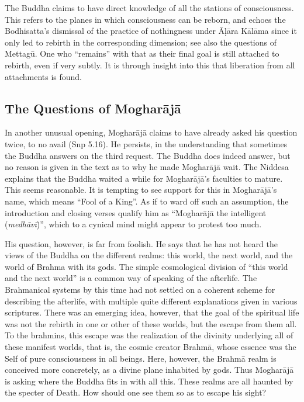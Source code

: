 \documentclass[12pt,openany]{book}%
\begin{document}
The Buddha claims to have direct knowledge of all the stations of consciousness. This refers to the planes in which consciousness can be reborn, and echoes the Bodhisatta's dismissal of the practice of nothingness under \textsanskrit{Āḷāra} \textsanskrit{Kālāma} since it only led to rebirth in the corresponding dimension; see also the questions of \textsanskrit{Mettagū}. One who “remains” with that as their final goal is still attached to rebirth, even if very subtly. It is through insight into this that liberation from all attachments is found.

\subsection*{The Questions of \textsanskrit{Mogharājā}}

In another unusual opening, \textsanskrit{Mogharājā} claims to have already asked his question twice, to no avail (Snp 5.16). He persists, in the understanding that sometimes the Buddha answers on the third request. The Buddha does indeed answer, but no reason is given in the text as to why he made \textsanskrit{Mogharājā} wait. The Niddesa explains that the Buddha waited a while for \textsanskrit{Mogharājā}’s faculties to mature. This seems reasonable. It is tempting to see support for this in \textsanskrit{Mogharājā}’s name, which means “Fool of a King”. As if to ward off such an assumption, the introduction and closing verses qualify him as “\textsanskrit{Mogharājā} the intelligent (\textit{\textsanskrit{medhāvī}})”, which to a cynical mind might appear to protest too much.

His question, however, is far from foolish. He says that he has not heard the views of the Buddha on the different realms: this world, the next world, and the world of Brahma with its gods. The simple cosmological division of “this world and the next world” is a common way of speaking of the afterlife. The Brahmanical systems by this time had not settled on a coherent scheme for describing the afterlife, with multiple quite different explanations given in various scriptures. There was an emerging idea, however, that the goal of the spiritual life was not the rebirth in one or other of these worlds, but the escape from them all. To the brahmins, this escape was the realization of the divinity underlying all of these manifest worlds, that is, the cosmic creator \textsanskrit{Brahmā}, whose essence was the Self of pure consciousness in all beings. Here, however, the \textsanskrit{Brahmā} realm is conceived more concretely, as a divine plane inhabited by gods. Thus \textsanskrit{Mogharājā} is asking where the Buddha fits in with all this. These realms are all haunted by the specter of Death. How should one see them so as to escape his sight?
\end{document}
